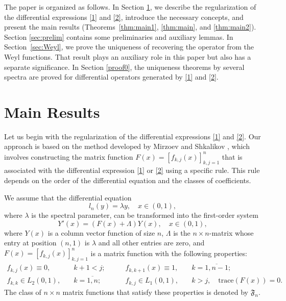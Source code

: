 \documentclass[reqno,12pt,centertags]{amsart}
\numberwithin{equation}{section}
\theoremstyle{definition}
\begin{document}
The paper is organized as follows. In Section \ref{main results}, we describe the regularization of the differential expressions \eqref{1} and \eqref{2}, introduce the necessary concepts, and present the main results (Theorems~\ref{thm:main1}, \ref{thm:main}, and \ref{thm:main2}). Section \ref{sec:prelim} contains some preliminaries and auxiliary lemmas. In Section~\ref{sec:Weyl}, we prove the uniqueness of recovering the operator from the Weyl functions. That result plays an auxiliary role in this paper but also has a separate significance.
In Section \ref{proof0}, the uniqueness theorems by several spectra are proved for differential operators generated by \eqref{1} and \eqref{2}.

	\section{Main Results}\label{main results}
	
	Let us begin with the regularization of the differential expressions \eqref{1} and \eqref{2}. Our approach is based on the method developed by Mirzoev and Shkalikov \cite{Mir1, Mir2}, which involves constructing the matrix function $F(x)=[f_{k,j}(x)]_{k,j=1}^{n}$ that is associated with the differential expression \eqref{1} or \eqref{2} using a specific rule. This rule depends on the order of the differential equation and the classes of coefficients. 
	
	We assume that the differential equation
	\begin{equation} \label{eqv}
		l_n(y) = \lambda y, \quad x \in (0, 1),
	\end{equation}
	where $\lambda$ is the spectral parameter, can be transformed into the first-order system
	\begin{equation} \label{sys}
		Y'(x) = (F(x) + \Lambda) Y(x), \quad x \in (0, 1),
	\end{equation}
	where $Y(x)$ is a column vector function of size $n$, $\Lambda$ is the $n \times n$-matrix whose entry at position $(n,1)$ is $\lambda$ and all other entries are zero, and $F(x) = [f_{k,j}(x)]_{k,j = 1}^n$ is a matrix function with the following properties:
\begin{equation*} \label{propF}
	\begin{array}{llll}
		f_{k,j}(x) \equiv 0, \quad & k + 1 < j; \qquad
		& f_{k,k+1}(x) \equiv 1, \quad & k = \overline{1,n-1}; \\
		f_{k,k} \in L_2(0,1), \quad & k = \overline{1,n}; \qquad
		& f_{k,j} \in L_1(0,1), \quad & k > j, \quad \mbox{trace}(F(x)) = 0.
	\end{array}
\end{equation*} The class of $n \times n$ matrix functions that satisfy these properties is denoted by $\mathfrak F_n$.
	
\end{document}
